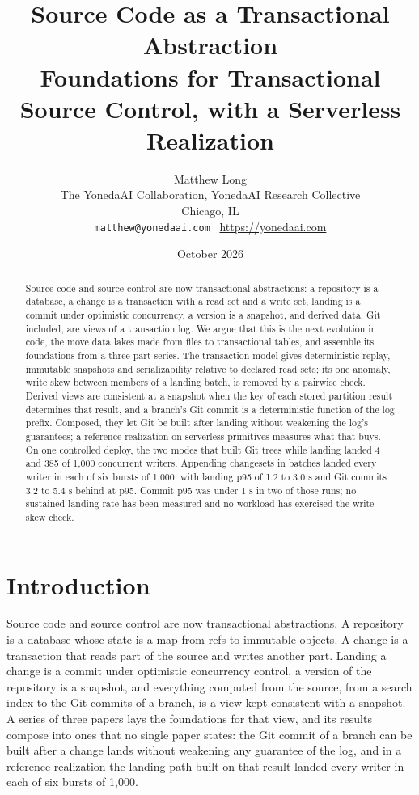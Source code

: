 \documentclass[11pt,letterpaper]{article}
\title{Source Code as a Transactional Abstraction\\[4pt]
  {\normalsize Foundations for Transactional Source Control, with a Serverless Realization}}
\author{Matthew Long\\
  \small The YonedaAI Collaboration, YonedaAI Research Collective\\
  \small Chicago, IL\\
  \small \texttt{matthew@yonedaai.com} \textperiodcentered\ \url{https://yonedaai.com}}
\date{October 2026}
\theoremstyle{definition}
\theoremstyle{remark}
\begin{document}
\maketitle

\begin{abstract}
Source code and source control are now transactional abstractions: a repository is a database, a change is a transaction with a read set and a write set, landing is a commit under optimistic concurrency, a version is a snapshot, and derived data, Git included, are views of a transaction log. We argue that this is the next evolution in code, the move data lakes made from files to transactional tables, and assemble its foundations from a three-part series. The transaction model gives deterministic replay, immutable snapshots and serializability relative to declared read sets; its one anomaly, write skew between members of a landing batch, is removed by a pairwise check. Derived views are consistent at a snapshot when the key of each stored partition result determines that result, and a branch's Git commit is a deterministic function of the log prefix. Composed, they let Git be built after landing without weakening the log's guarantees; a reference realization on serverless primitives measures what that buys. On one controlled deploy, the two modes that built Git trees while landing landed 4 and 385 of 1,000 concurrent writers. Appending changesets in batches landed every writer in each of six bursts of 1,000, with landing p95 of 1.2 to 3.0 s and Git commits 3.2 to 5.4 s behind at p95. Commit p95 was under 1 s in two of those runs; no sustained landing rate has been measured and no workload has exercised the write-skew check. %
\end{abstract}

\section{Introduction}
\label{sec:syn:intro}

Source code and source control are now transactional abstractions. A repository is a database whose state is a map from refs to immutable objects. A change is a transaction that reads part of the source and writes another part. Landing a change is a commit under optimistic concurrency control, a version of the repository is a snapshot, and everything computed from the source, from a search index to the Git commits of a branch, is a view kept consistent with a snapshot. A series of three papers lays the foundations for that view, and its results compose into ones that no single paper states: the Git commit of a branch can be built after a change lands without weakening any guarantee of the log, and in a reference realization the landing path built on that result landed every writer in each of six bursts of 1,000. %
\end{document}
